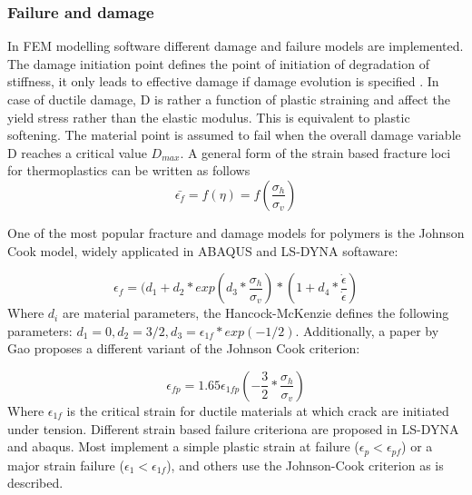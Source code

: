 \subsubsection{Failure and damage}
In FEM modelling software different damage and failure models are implemented. The damage initiation point defines the point of initiation of degradation of stiffness, it only leads to effective damage if damage evolution is specified \cite{ABAQUS2006MaterialFailure}. In case of ductile damage, D is rather a function of plastic straining and affect the yield stress rather than the elastic modulus. This is equivalent to plastic softening. The material point is assumed to fail when the overall damage variable D reaches a critical value $D_{max}$.
A general form of the strain based fracture loci for thermoplastics can be written as follows
\begin{equation}\label{AzziTsai}
\bar{\epsilon_f}=f(\eta)=f(\frac{\sigma_h}{\sigma_v})
\end{equation}

One of the most popular fracture and damage models for polymers is the Johnson Cook model, widely applicated in ABAQUS and LS-DYNA softaware:

\begin{equation}\label{AzziTsai}
\epsilon_f=(d_1+d_2*exp{(d_3*\frac{\sigma_h}{\sigma_v})}*(1+d_4*\frac{\dot{\epsilon}}{\dot{\epsilon}})
\end{equation}
Where $d_i$ are material parameters\cite{BoisA:}, the Hancock-McKenzie defines the following parameters: $d_1=0, d_2=3/2, d_3=\epsilon_{1f}*exp(-1/2)$. Additionally, a paper by Gao \cite{Gao2013CriticalPipelines} proposes a different variant of the Johnson Cook criterion:

\begin{equation}\label{AzziTsai}
\epsilon_{fp}=1.65\epsilon_{1fp}{(-\frac{3}{2}*\frac{\sigma_h}{\sigma_v})}
\end{equation}Where $\epsilon_{1f}$ is the critical strain for ductile materials at which crack are initiated under tension. Different strain based failure criteriona are proposed in LS-DYNA and abaqus. Most implement a simple plastic strain at failure ($\epsilon_p<\epsilon_{pf}$) or a major strain failure ($\epsilon_1<\epsilon_{1f}$), and others use the Johnson-Cook criterion as is described.  

